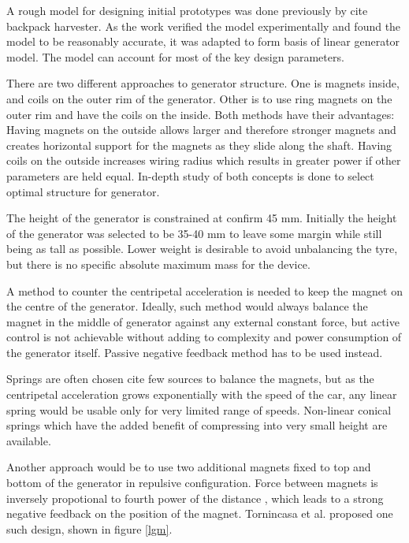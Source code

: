 A rough model for designing initial prototypes was done previously by  {\color{red} cite backpack harvester}. As the work verified the model experimentally and found the model to be reasonably accurate, it was adapted to form basis of linear generator model. The model can account for most of the key design parameters. 

There are two different approaches to generator structure. One is magnets inside, and coils on the outer rim of the generator. Other is to use ring magnets on the outer rim and have the coils on the inside. Both methods have their advantages: Having magnets on the outside allows larger and therefore stronger magnets and creates horizontal support for the magnets as they slide along the shaft. Having coils on the outside increases wiring radius which results in greater power if other parameters are held equal. In-depth study of both concepts is done to select optimal structure for generator. 

The height of the generator is constrained at  {\color{yellow} confirm} 45 mm. Initially the height of {\color{gray} the} generator was selected to be 35-40 mm to leave some margin while still being as tall as possible. Lower weight is desirable to avoid unbalancing the tyre, but there is no specific absolute maximum mass for the device. 

A method to counter the centripetal acceleration is needed to keep the magnet on the centre of the generator. Ideally, such method would always balance the magnet in the middle of generator against any external constant force, but active control is not achievable without adding to complexity and power consumption of the generator itself. Passive negative feedback method has to be used instead. 

Springs are often chosen {\color{red} cite few sources} to balance the magnets, but as the centripetal acceleration grows exponentially with the speed of the car, any linear spring would be usable only for very limited range of speeds. Non-linear conical springs which have the added benefit of compressing into very small height are available.

Another approach would be to use two additional magnets fixed to top and bottom of the generator in repulsive configuration. Force between magnets is inversely propotional to fourth power of the distance \cite{Amrani2015}, which leads to a strong negative feedback on the position of the magnet. Tornincasa et al. \cite{Tornincasa2012} proposed one such design, shown in figure \ref{lgm}.

